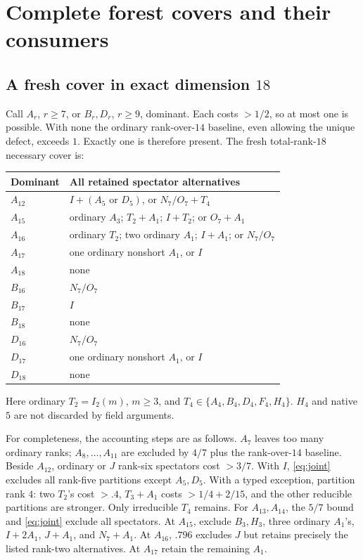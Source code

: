 \documentclass[11pt]{article}
\theoremstyle{definition}
\theoremstyle{remark}
\begin{document}
\section{Complete forest covers and their consumers}
\label{sec:forests}
\subsection{A fresh cover in exact dimension \(18\)}
Call \(A_r\), \(r\geq7\), or \(B_r,D_r\), \(r\geq9\),
dominant. Each costs \(>1/2\), so at most one is possible.
With none the ordinary rank-over-\(14\) baseline, even allowing
the unique defect, exceeds \(1\). Exactly one is therefore present.
The fresh total-rank-\(18\) necessary cover is:
\begin{center}\small
\begin{tabular}{p{.14\linewidth}p{.75\linewidth}}
\toprule
Dominant&All retained spectator alternatives\\ \midrule
\(A_{12}\)&\(I+(A_5\text{ or }D_5)\), or \(N_7/O_7+T_4\)\\
\(A_{15}\)&ordinary \(A_3\); \(T_2+A_1\); \(I+T_2\); or \(O_7+A_1\)\\
\(A_{16}\)&ordinary \(T_2\); two ordinary \(A_1\); \(I+A_1\); or \(N_7/O_7\)\\
\(A_{17}\)&one ordinary nonshort \(A_1\), or \(I\)\\
\(A_{18}\)&none\\
\(B_{16}\)&\(N_7/O_7\)\\
\(B_{17}\)&\(I\)\\
\(B_{18}\)&none\\
\(D_{16}\)&\(N_7/O_7\)\\
\(D_{17}\)&one ordinary nonshort \(A_1\), or \(I\)\\
\(D_{18}\)&none\\ \bottomrule
\end{tabular}
\end{center}
Here ordinary \(T_2=I_2(m)\), \(m\geq3\), and
\(T_4\in\{A_4,B_4,D_4,F_4,H_4\}\).
\(H_4\) and native \(5\) are not discarded by field arguments.

For completeness, the accounting steps are as follows.
\(A_7\) leaves too many ordinary ranks;
\(A_8,\ldots,A_{11}\) are excluded by \(4/7\) plus
the rank-over-\(14\) baseline.
Beside \(A_{12}\), ordinary or \(J\) rank-six spectators cost
\(>3/7\). With \(I\), \eqref{eq:joint} excludes all rank-five
partitions except \(A_5,D_5\). With a typed exception, partition
rank \(4\): two \(T_2\)'s cost \(>.4\), \(T_3+A_1\) costs
\(>1/4+2/15\), and the other reducible partitions are stronger.
Only irreducible \(T_4\) remains. For \(A_{13},A_{14}\),
the \(5/7\) bound and \eqref{eq:joint} exclude all spectators.
At \(A_{15}\), exclude \(B_3,H_3\), three ordinary \(A_1\)'s,
\(I+2A_1\), \(J+A_1\), and \(N_7+A_1\).
At \(A_{16}\), \(.796\) excludes \(J\) but retains precisely
the listed rank-two alternatives. At \(A_{17}\) retain the
remaining \(A_1\).
\end{document}
